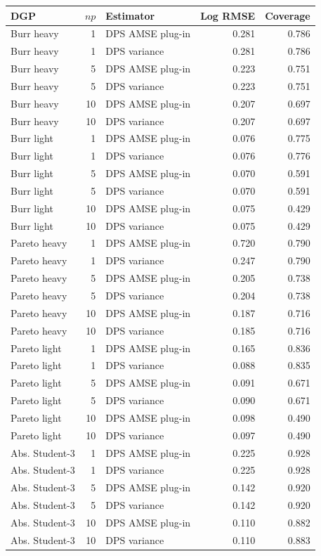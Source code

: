\begin{tabular}{lrlrr}
\toprule
DGP & $np$ & Estimator & Log RMSE & Coverage \\
\midrule
Burr heavy & 1 & DPS AMSE plug-in & 0.281 & 0.786 \\
Burr heavy & 1 & DPS variance & 0.281 & 0.786 \\
Burr heavy & 5 & DPS AMSE plug-in & 0.223 & 0.751 \\
Burr heavy & 5 & DPS variance & 0.223 & 0.751 \\
Burr heavy & 10 & DPS AMSE plug-in & 0.207 & 0.697 \\
Burr heavy & 10 & DPS variance & 0.207 & 0.697 \\
Burr light & 1 & DPS AMSE plug-in & 0.076 & 0.775 \\
Burr light & 1 & DPS variance & 0.076 & 0.776 \\
Burr light & 5 & DPS AMSE plug-in & 0.070 & 0.591 \\
Burr light & 5 & DPS variance & 0.070 & 0.591 \\
Burr light & 10 & DPS AMSE plug-in & 0.075 & 0.429 \\
Burr light & 10 & DPS variance & 0.075 & 0.429 \\
Pareto heavy & 1 & DPS AMSE plug-in & 0.720 & 0.790 \\
Pareto heavy & 1 & DPS variance & 0.247 & 0.790 \\
Pareto heavy & 5 & DPS AMSE plug-in & 0.205 & 0.738 \\
Pareto heavy & 5 & DPS variance & 0.204 & 0.738 \\
Pareto heavy & 10 & DPS AMSE plug-in & 0.187 & 0.716 \\
Pareto heavy & 10 & DPS variance & 0.185 & 0.716 \\
Pareto light & 1 & DPS AMSE plug-in & 0.165 & 0.836 \\
Pareto light & 1 & DPS variance & 0.088 & 0.835 \\
Pareto light & 5 & DPS AMSE plug-in & 0.091 & 0.671 \\
Pareto light & 5 & DPS variance & 0.090 & 0.671 \\
Pareto light & 10 & DPS AMSE plug-in & 0.098 & 0.490 \\
Pareto light & 10 & DPS variance & 0.097 & 0.490 \\
Abs. Student-3 & 1 & DPS AMSE plug-in & 0.225 & 0.928 \\
Abs. Student-3 & 1 & DPS variance & 0.225 & 0.928 \\
Abs. Student-3 & 5 & DPS AMSE plug-in & 0.142 & 0.920 \\
Abs. Student-3 & 5 & DPS variance & 0.142 & 0.920 \\
Abs. Student-3 & 10 & DPS AMSE plug-in & 0.110 & 0.882 \\
Abs. Student-3 & 10 & DPS variance & 0.110 & 0.883 \\
\bottomrule
\end{tabular}
